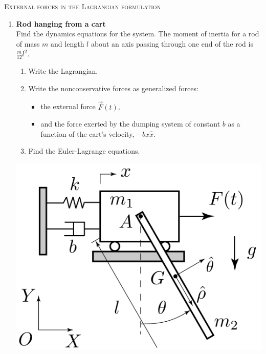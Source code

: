 \documentclass[11pt, a4paper, twoside]{article}
\begin{document}
\begin{center}
  \textsc{\large External forces in the Lagrangian formulation}
\end{center}

\begin{enumerate}

\item 
\begin{minipage}[t][4.8cm]{0.55\textwidth} 
\textbf{Rod hanging from a cart}\\
Find the dynamics equations for the system.
The moment of inertia for a rod of mass \(m\) and length \(l\) about an axis passing through one end of the rod is \(\frac{m}{12} l^2\). 
\begin{enumerate}
	\item Write the Lagrangian.
	\item Write the nonconservative forces as generalized forces:
	\begin{itemize}
		\item the external force \(\vec{F}(t)\),
		\item and the force exerted by the dumping system of constant \(b\) as a function of the cart's velocity, \(- b \dot{x} \hat{x}\).
	\end{itemize}
	\item Find the Euler-Lagrange equations. 
\end{enumerate}
\end{minipage}
\begin{minipage}[c][0cm][t]{0.4\textwidth}
	\includegraphics[width=\textwidth]{figures/zweite}
\end{minipage}





\end{enumerate}
\end{document}
